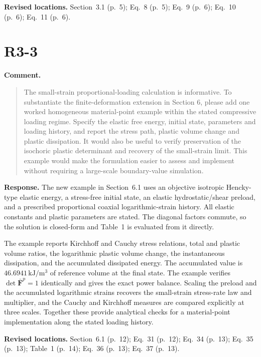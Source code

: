 \documentclass[11pt]{article}
\begin{document}
\textbf{Revised locations.} Section~3.1 (p.~5); Eq.~8 (p.~5); Eq.~9 (p.~6); Eq.~10 (p.~6); Eq.~11 (p.~6).
\section{R3-3}
\textbf{Comment.}\begin{quote}\small
The small-strain proportional-loading calculation is informative. To substantiate the finite-deformation extension in Section 6, please add one worked homogeneous material-point example within the stated compressive loading regime. Specify the elastic free energy, initial state, parameters and loading history, and report the stress path, plastic volume change and plastic dissipation. It would also be useful to verify preservation of the isochoric plastic determinant and recovery of the small-strain limit. This example would make the formulation easier to assess and implement without requiring a large-scale boundary-value simulation.
\end{quote}
\textbf{Response.} The new example in Section~6.1 uses an objective isotropic
Hencky-type elastic energy, a stress-free initial state, an elastic
hydrostatic/shear preload, and a prescribed proportional coaxial
logarithmic-strain history. All elastic constants and plastic parameters are
stated. The diagonal factors commute, so the solution is closed-form and
Table~1 is evaluated from it directly.

The example reports Kirchhoff and Cauchy stress relations, total and plastic
volume ratios, the logarithmic plastic volume change, the instantaneous
dissipation, and the accumulated dissipated energy. The accumulated value is
\(46.6941\,\mathrm{kJ/m^3}\) of reference volume at the final state. The
example verifies \(\det\bar{\mathbf F}^p=1\) identically and gives the exact
power balance. Scaling the preload and the accumulated logarithmic strains
recovers the small-strain stress-rate law and multiplier, and the Cauchy and
Kirchhoff measures are compared explicitly at three scales. Together these
provide analytical checks for a material-point implementation along the stated
loading history.

\textbf{Revised locations.} Section~6.1 (p.~12); Eq.~31 (p.~12); Eq.~34 (p.~13); Eq.~35 (p.~13); Table~1 (p.~14); Eq.~36 (p.~13); Eq.~37 (p.~13).
\end{document}
